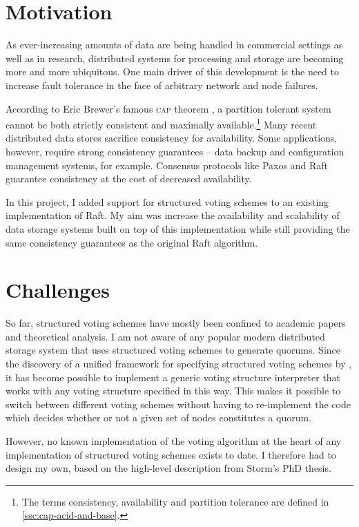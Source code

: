 \documentclass[draft,11pt,chapterprefix=true,toc=bibliography,numbers=noendperiod,
               footnotes=multiple,twoside]{scrreprt}
\begin{document}
\section{Motivation\label{sc:motivation}}

As ever-increasing amounts of data are being handled in commercial settings as well as in research, distributed systems for processing and storage are becoming more and more ubiquitous. One main driver of this development is the need to increase fault tolerance in the face of arbitrary network and node failures.

According to Eric Brewer's famous \textsc{cap} theorem \autocite{cap}, a partition tolerant system cannot be both strictly consistent and maximally available.\footnote{The terms consistency, availability and partition tolerance are defined in \autoref{ssc:cap-acid-and-base}.} Many recent distributed data stores sacrifice consistency for availability. Some applications, however, require strong consistency guarantees -- data backup and configuration management systems, for example. Consensus protocols like Paxos \autocite{paxos} and Raft \autocite{raft} guarantee consistency at the cost of decreased availability.

In this project, I added support for structured voting schemes to an existing implementation of Raft. My aim was increase the availability and scalability of data storage systems built on top of this implementation while still providing the same consistency guarantees as the original Raft algorithm.

\section{Challenges\label{sc:challenges}}

So far, structured voting schemes have mostly been confined to academic papers and theoretical analysis. I am not aware of any popular modern distributed storage system that uses structured voting schemes to generate quorums. Since the discovery of a unified framework for specifying structured voting schemes by \citeauthor{generators}, it has become possible to implement a generic voting structure interpreter that works with any voting structure specified in this way. This makes it possible to switch between different voting schemes without having to re-implement the code which decides whether or not a given set of nodes constitutes a quorum.

However, no known implementation of the voting algorithm at the heart of any implementation of structured voting schemes exists to date. I therefore had to design my own, based on the high-level description from Storm's PhD thesis.
\end{document}
